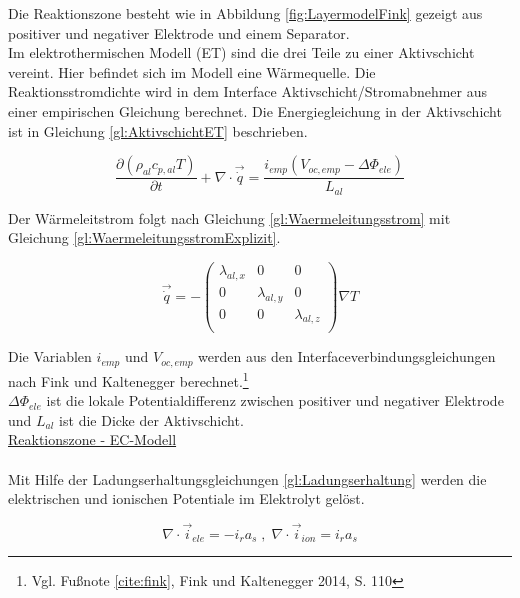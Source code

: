 Die Reaktionszone besteht wie in Abbildung \ref{fig:LayermodelFink} gezeigt aus positiver und negativer Elektrode und einem Separator. \\
Im elektrothermischen Modell (ET) sind die drei Teile zu einer Aktivschicht vereint. Hier befindet sich im Modell eine Wärmequelle. Die Reaktionsstromdichte wird in dem Interface Aktivschicht/Stromabnehmer aus einer empirischen Gleichung berechnet. Die Energiegleichung in der Aktivschicht ist in Gleichung \ref{gl:AktivschichtET} beschrieben.

\begin{equation}
	\frac{\partial (\rho_{al} c_{p,al} T)}{\partial t} + \nabla \cdot \vec{\dot{q}} = \frac{i_{emp} ( V_{oc,emp} - \Delta \Phi_{ele} )}{L_{al}} \label{gl:AktivschichtET}
\end{equation} 

Der Wärmeleitstrom folgt nach Gleichung \ref{gl:Waermeleitungsstrom} mit Gleichung \ref{gl:WaermeleitungsstromExplizit}.

\begin{equation}
	\vec{\dot{q}} = - \left( \begin{array}{ccc} \lambda_{al,x} & 0 & 0\\ 0 & \lambda_{al,y} & 0 \\ 0 & 0 & \lambda_{al,z}\\ \end{array} \right) \nabla T \label{gl:WaermeleitungsstromExplizit}
\end{equation}
 
Die Variablen $i_{emp}$ und $V_{oc,emp}$ werden aus den Interfaceverbindungsgleichungen nach Fink und Kaltenegger berechnet.\footnote{Vgl. Fußnote \ref{cite:fink}, Fink und Kaltenegger 2014,  S. 110}\\
$\Delta \Phi_{ele}$ ist die lokale Potentialdifferenz zwischen positiver und negativer Elektrode und $L_{al}$ ist die Dicke der Aktivschicht.\\
 
\underline{Reaktionszone - EC-Modell}\\
\\

Mit Hilfe der Ladungserhaltungsgleichungen \ref{gl:Ladungserhaltung} werden die elektrischen und ionischen Potentiale im Elektrolyt gelöst.

\begin{equation}
	\nabla \cdot \vec{i}_{ele} = - i_{r} a_{s} \; , \; \nabla \cdot \vec{i}_{ion} = i_{r} a_{s} \label{gl:Ladungserhaltung}
\end{equation}


